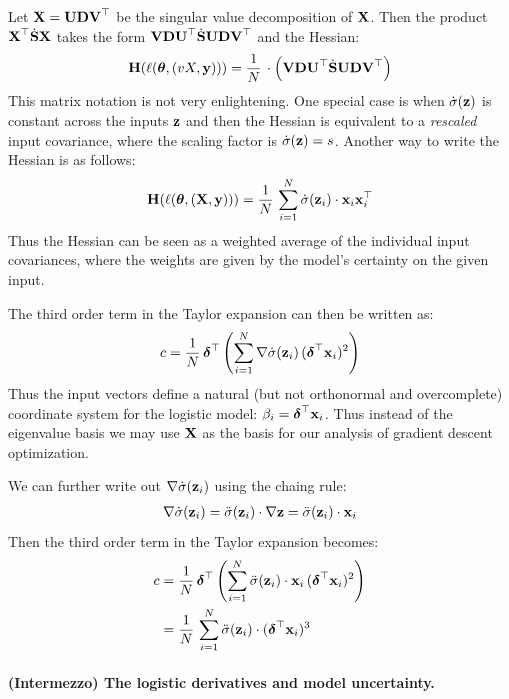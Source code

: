 \documentclass{article} %
\newcommand{\hessian}{\vH}
\begin{document}
Let $\mbox{$\mbox{$\mathbf{X}$}$} = \mbox{$\mbox{$\mathbf{U}$}$} \mbox{$\mbox{$\mathbf{D}$}$} \mbox{$\mbox{$\mathbf{V}$}$}^\top $ be the singular value decomposition of $\mbox{$\mbox{$\mathbf{X}$}$}$. Then the product $\mbox{$\mbox{$\mathbf{X}$}$}^\top  \dot{\mbox{$\mbox{$\mathbf{S}$}$}} \mbox{$\mbox{$\mathbf{X}$}$}$ takes the form $\mbox{$\mbox{$\mathbf{V}$}$} \mbox{$\mbox{$\mathbf{D}$}$} \mbox{$\mbox{$\mathbf{U}$}$}^\top \dot{\mbox{$\mbox{$\mathbf{S}$}$}} \mbox{$\mbox{$\mathbf{U}$}$} \mbox{$\mbox{$\mathbf{D}$}$} \mbox{$\mbox{$\mathbf{V}$}$}^\top$ and the Hessian: 
\begin{align}
    \hessian(\loss(\vparam, (vX, \vy))) = \frac{1}{N}\, \cdot \rnd{\vV \vD \vU^\top \dot\vS \vU \vD \vV^\top}
\end{align}
This matrix notation is not very enlightening. One special case is when $\dot\sigma(\mbox{$\mbox{$\mathbf{z}$}$})$ is constant across the inputs $\mbox{$\mbox{$\mathbf{z}$}$}$ and then the Hessian is equivalent to a \emph{rescaled} input covariance, where the scaling factor is $\dot\sigma(\mbox{$\mbox{$\mathbf{z}$}$})=s$. Another way to write the Hessian is as follows: 
\begin{align}
\label{eq:Hessian}
    \hessian(\loss(\vparam, (\vX, \vy))) = \frac{1}{N}\, \sum_{i=1}^N \dot\sigma(\vz_i) \cdot \vx_i\vx_i^\top
\end{align}
Thus the Hessian can be seen as a weighted average of the individual input covariances, where the weights are given by the model's certainty on the given input.

The third order term in the Taylor expansion can then be written as: 
\begin{align}
\label{eq:Taylor-third-logistic-better}
    c =  \frac{1}{N}\,\mbox{$\mbox{$\boldsymbol{\delta}$}$}^\top  \left(\sum_{i=1}^N\nabla\dot\sigma(\mbox{$\mbox{$\mathbf{z}$}$}_i)\, (\mbox{$\mbox{$\boldsymbol{\delta}$}$}^\top \mbox{$\mbox{$\mathbf{x}$}$}_i)^2 \right)
\end{align}
Thus the input vectors define a natural (but not orthonormal and overcomplete) coordinate system for the logistic model: $\beta_i = \mbox{$\mbox{$\boldsymbol{\delta}$}$}^\top \mbox{$\mbox{$\mathbf{x}$}$}_i$. 
Thus instead of the eigenvalue basis we may use $\mbox{$\mbox{$\mathbf{X}$}$}$ as the basis for our analysis of gradient descent optimization. 

We can further write out $\nabla\dot\sigma(\mbox{$\mbox{$\mathbf{z}$}$}_i)$ using the chaing rule: 
\begin{align}
    \nabla\dot\sigma(\mbox{$\mbox{$\mathbf{z}$}$}_i) = \ddot\sigma(\mbox{$\mbox{$\mathbf{z}$}$}_i)\cdot \nabla\mbox{$\mbox{$\mathbf{z}$}$} = \ddot\sigma(\mbox{$\mbox{$\mathbf{z}$}$}_i)\cdot \mbox{$\mbox{$\mathbf{x}$}$}_i 
\end{align}
Then the third order term in the Taylor expansion becomes:
\begin{align}
    c 
    &=  \frac{1}{N}\, \mbox{$\mbox{$\boldsymbol{\delta}$}$}^\top  \left(\sum_{i=1}^N \ddot\sigma(\mbox{$\mbox{$\mathbf{z}$}$}_i)\cdot \mbox{$\mbox{$\mathbf{x}$}$}_i\, (\mbox{$\mbox{$\boldsymbol{\delta}$}$}^\top \mbox{$\mbox{$\mathbf{x}$}$}_i)^2 \right) \\
    &= \frac{1}{N} \,\sum_{i=1}^N\ddot\sigma(\mbox{$\mbox{$\mathbf{z}$}$}_i)\cdot(\mbox{$\mbox{$\boldsymbol{\delta}$}$}^\top \mbox{$\mbox{$\mathbf{x}$}$}_i)^3
\end{align}

\paragraph{(Intermezzo) The logistic derivatives and model uncertainty.}
\end{document}
